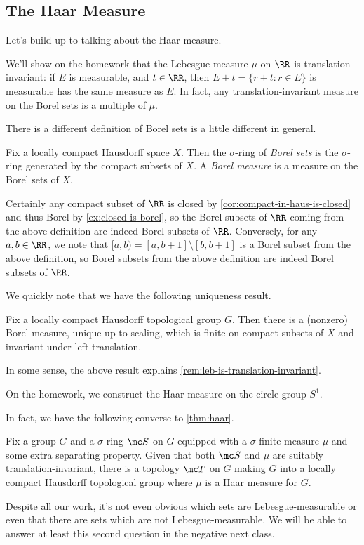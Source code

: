 \documentclass[../notes.tex]{subfiles}
\begin{document}
\subsection{The Haar Measure}
Let's build up to talking about the Haar measure.
\begin{remark} \label{rem:leb-is-translation-invariant}
	We'll show on the homework that the Lebesgue measure $\mu$ on $\RR$ is translation-invariant: if $E$ is measurable, and $t\in\RR$, then $E+t=\{r+t:r\in E\}$ is measurable has the same measure as $E$. In fact, any translation-invariant measure on the Borel sets is a multiple of $\mu$.
\end{remark}
There is a different definition of Borel sets is a little different in general.
\begin{definition}
	Fix a locally compact Hausdorff space $X$. Then the $\sigma$-ring of \textit{Borel sets} is the $\sigma$-ring generated by the compact subsets of $X$. A \textit{Borel measure} is a measure on the Borel sets of $X$.
\end{definition}
\begin{example}
	Certainly any compact subset of $\RR$ is closed by \autoref{cor:compact-in-haus-is-closed} and thus Borel by \autoref{ex:closed-is-borel}, so the Borel subsets of $\RR$ coming from the above definition are indeed Borel subsets of $\RR$. Conversely, for any $a,b\in\RR$, we note that $[a,b)=[a,b+1]\setminus[b,b+1]$ is a Borel subset from the above definition, so Borel subsets from the above definition are indeed Borel subsets of $\RR$.
\end{example}
We quickly note that we have the following uniqueness result.
\begin{theorem}[Haar] \label{thm:haar}
	Fix a locally compact Hausdorff topological group $G$. Then there is a (nonzero) Borel measure, unique up to scaling, which is finite on compact subsets of $X$ and invariant under left-translation.
\end{theorem}
In some sense, the above result explains \autoref{rem:leb-is-translation-invariant}.
\begin{remark}
	On the homework, we construct the Haar measure on the circle group $S^1$.
\end{remark}
In fact, we have the following converse to \autoref{thm:haar}.
\begin{theorem}[Weil]
	Fix a group $G$ and a $\sigma$-ring $\mc S$ on $G$ equipped with a $\sigma$-finite measure $\mu$ and some extra separating property. Given that both $\mc S$ and $\mu$ are suitably translation-invariant, there is a topology $\mc T$ on $G$ making $G$ into a locally compact Hausdorff topological group where $\mu$ is a Haar measure for $G$.
\end{theorem}
Despite all our work, it's not even obvious which sets are Lebesgue-measurable or even that there are sets which are not Lebesgue-measurable. We will be able to answer at least this second question in the negative next class.
\end{document}
